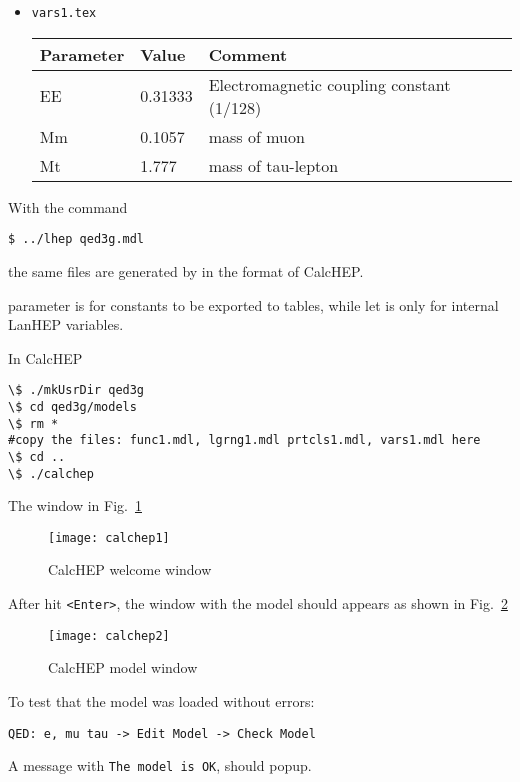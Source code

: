 \begin{frame}{}
\begin{itemize}
\item \lstinline{vars1.tex}
  \begin{center}
    \begin{tabular}{|l|l|l|} \hline
Parameter & Value & Comment \\ \hline
EE    &0.31333             &Electromagnetic coupling constant (1/128) \\
Mm    &0.1057              &mass of muon \\
Mt    &1.777               &mass of tau-lepton \\ \hline
\end{tabular}
  \end{center}
\end{itemize}

With the command
\begin{lstlisting}
$ ../lhep qed3g.mdl
\end{lstlisting}
the same files are generated by in the format of CalcHEP.

parameter is for constants to be exported to tables, while let is only for internal LanHEP variables.

In CalcHEP
\begin{lstlisting}
\$ ./mkUsrDir qed3g
\$ cd qed3g/models
\$ rm *
#copy the files: func1.mdl, lgrng1.mdl prtcls1.mdl, vars1.mdl here
\$ cd ..
\$ ./calchep
\end{lstlisting}
The window in Fig.~\ref{fig:calchep1}
\begin{figure}
  \centering
  \texttt{[image: calchep1]}
  \caption{CalcHEP welcome window}
  \label{fig:calchep1}
\end{figure}
After hit \lstinline{<Enter>}, the window with the model should appears as shown in Fig.~\ref{fig:calchep2}
\begin{figure}
  \centering
  \texttt{[image: calchep2]}
  \caption{CalcHEP model window}
  \label{fig:calchep2}
\end{figure}
To test that the model was loaded without errors:
\begin{lstlisting}
QED: e, mu tau -> Edit Model -> Check Model
\end{lstlisting}
A message with \lstinline{The model is OK}, should popup.


\end{frame}
